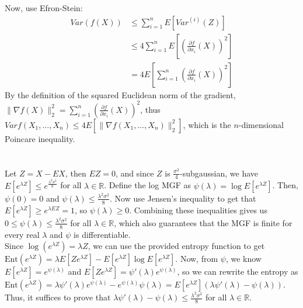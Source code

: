 \documentclass[11pt,a4paper,margin=1in]{article}
\begin{document}
Now, use Efron-Stein:
\begin{align*}
    Var(f(X)) &\leq \sum_{i = 1}^{n}E[Var^{(i)}(Z)] \\
    &\leq 4\sum_{i = 1}^{n}E\left[\left(\frac{\partial f}{\partial x_i}(X)\right)^2\right] \\
    &= 4E\left[\sum_{i = 1}^{n}\left(\frac{\partial f}{\partial x_i}(X)\right)^2\right]
\end{align*}
By the definition of the squared Euclidean norm of the gradient, $\|\nabla f(X)\|_2^2 = \sum_{i = 1}^{n}\left(\frac{\partial f}{\partial x_i}(X)\right)^2$, 
thus $Var f(X_1, \ldots, X_n) \leq 4E[\|\nabla f(X_1, \ldots, X_n)\|_2^2]$, which 
is the $n$-dimensional Poincare inequality.



\section{}
Let $Z = X - EX$, then $EZ = 0$, and since $Z$ is $\frac{\sigma^2}{4}$-subgaussian,
we have $E[e^{\lambda Z}] \leq e^{\frac{\lambda^2\sigma^2}{8}}$ for all $\lambda \in \mathbb{R}$.
Define the log MGF as $\psi(\lambda) = \log E[e^{\lambda Z}]$. Then, $\psi(0) = 0$
and $\psi(\lambda) \leq \frac{\lambda^2\sigma^2}{8}$. Now use Jensen's inequality
to get that $E[e^{\lambda Z}] \geq e^{\lambda EZ} = 1$, so $\psi(\lambda) \geq 0$.
Combining these inequalities gives us $0 \leq \psi(\lambda) \leq \frac{\lambda^2\sigma^2}{8}$ 
for all $\lambda \in \mathbb{R}$, which also guarantees that the MGF is finite
for every real $\lambda$ and $\psi$ is differentiable. \\

\noindent
Since $\log(e^{\lambda Z}) = \lambda Z$, we can use the provided entropy function
to get $\text{Ent}(e^{\lambda Z}) = \lambda E[Ze^{\lambda Z}] - E[e^{\lambda Z}]\log E[e^{\lambda Z}]$.
Now, from $\psi$, we know $E[e^{\lambda Z}] = e^{\psi(\lambda)}$ and $E[Ze^{\lambda Z}] = \psi'(\lambda)e^{\psi(\lambda)}$, 
so we can rewrite the entropy as $\text{Ent}(e^{\lambda Z}) = \lambda \psi'(\lambda)e^{\psi(\lambda)} - e^{\psi(\lambda)}\psi(\lambda) = E[e^{\lambda Z}](\lambda \psi'(\lambda) - \psi(\lambda))$.
Thus, it suffices to prove that $\lambda \psi'(\lambda) - \psi(\lambda) \leq \frac{\lambda^2\sigma^2}{8}$ 
for all $\lambda \in \mathbb{R}$. \\
\end{document}
